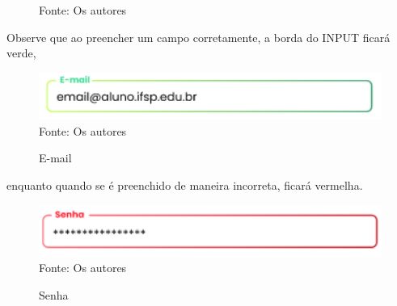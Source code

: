 \documentclass[12pt,a4paper]{article}
\begin{document}
\begin{itemize}
\begin{figure}[H]
                Fonte: Os autores
                \label{pt}
            \end{figure}
        Observe que ao preencher um campo corretamente, a borda do INPUT ficará verde, 
        \begin{figure}[H]
                \centering
                \caption{E-mail}
                \includegraphics[width=15cm]{prot7.png}
                Fonte: Os autores
            \end{figure}
        enquanto quando se é preenchido de maneira incorreta, ficará vermelha.
         \begin{figure}[H]
                \centering
                \caption{Senha}
                \includegraphics[width=15cm]{prot8.png}
                Fonte: Os autores
            \end{figure}
    

\end{itemize}
\end{document}
